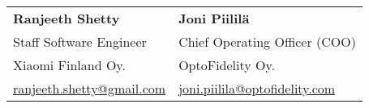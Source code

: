 \documentclass{article}
\begin{document}
\subsection{}
\setlength{\tabcolsep}{24pt}
\begin{tabular}{l l}
  \textbf{Ranjeeth Shetty} & \textbf{Joni Piililä} \\
  Staff Software Engineer & Chief Operating Officer (COO) \\
  Xiaomi Finland Oy. & OptoFidelity Oy. \\
  \href{mailto:me@example.com}{ranjeeth.shetty@gmail.com} & \href{mailto:me@example.com}{joni.piilila@optofidelity.com} \\
\end{tabular}
\subsection{}
\end{document}
